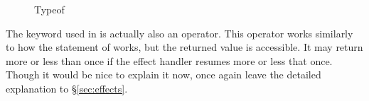 \begin{figure}[h]
{\begin{prooftree}
        \end{prooftree}
    }
    \parbox[t]{0.48\linewidth}{
        \begin{prooftree}
        \end{prooftree}
    }
    \parbox[t]{0.48\linewidth}{
        \begin{prooftree}
        \end{prooftree}
    }
    \parbox[t]{0.48\linewidth}{
        \begin{prooftree}
        \end{prooftree}
    }
    \parbox[t]{0.48\linewidth}{
        \begin{prooftree}
        \end{prooftree}
    }
    \parbox[t]{0.48\linewidth}{
        \begin{prooftree}
        \end{prooftree}
    }
    \parbox[t]{0.48\linewidth}{
        \begin{prooftree}
        \end{prooftree}
    }
    \parbox[t]{0.48\linewidth}{
        \begin{prooftree}
        \end{prooftree}
    }
    \caption{\label{fig:typeof}Typeof}
\end{figure}

The  keyword used in \Poetry{} is actually also an operator. This operator
works similarly to how the  statement of \Prose{} works, but the returned
value is accessible. It may return more or less than once if the effect handler resumes
more or less that once. Though it would be nice to explain it now, once again leave
the detailed explanation to \S\ref{sec:effects}.

\FloatBarrier
